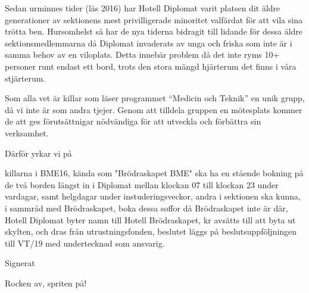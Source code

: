 \documentclass[../_main/handlingar.tex]{subfiles}
\begin{document}
Sedan urminnes tider (läs 2016) har Hotell Diplomat varit platsen dit äldre
generationer av sektionens mest privilligerade minoritet valfärdat för att vila
sina trötta ben. Hursomhelst så har de nya tiderna bidragit till lidande för
dessa äldre sektionsmedlemmarna då Diplomat invaderats av unga och friska
som inte är i samma behov av en viloplats. Detta innebär problem då det inte
ryms 10+ personer runt endast ett bord, trots den stora mängd hjärterum det finns i våra stjärterum.

Som alla vet är killar som läser programmet ``Medicin och Teknik'' en unik
grupp, då vi inte är som andra tjejer. Genom att tilldela gruppen en mötesplats
kommer de att ges förutsättnigar nödvändiga för att utveckla och förbättra sin
verksamhet.

Därför yrkar vi på
\begin{attsatser}
  \att killarna i BME16, kända som "Brödraskapet BME" ska ha en stående
  bokning på de två borden längst in i Diplomat mellan klockan 07 till klockan
  23 under vardagar, samt helgdagar under instuderingsveckor,
  \att andra i sektionen ska kunna, i sammråd med Brödraskapet, boka dessa
  soffor då Brödraskapet inte är där,
  \att Hotell Diplomat byter namn till Hotell Brödraskapet,
   kr avsätts till att byta ut skylten, och dras från utrustningsfonden,
  \att beslutet läggs på beslutsuppföljningen till VT/19 med undertecknad som ansvarig.

\end{attsatser}

\begin{signatures}{1}
    Signerat
    \signature{Brödraskapet BME}{Rocken av, spriten på!}

\end{signatures}
\end{document}
